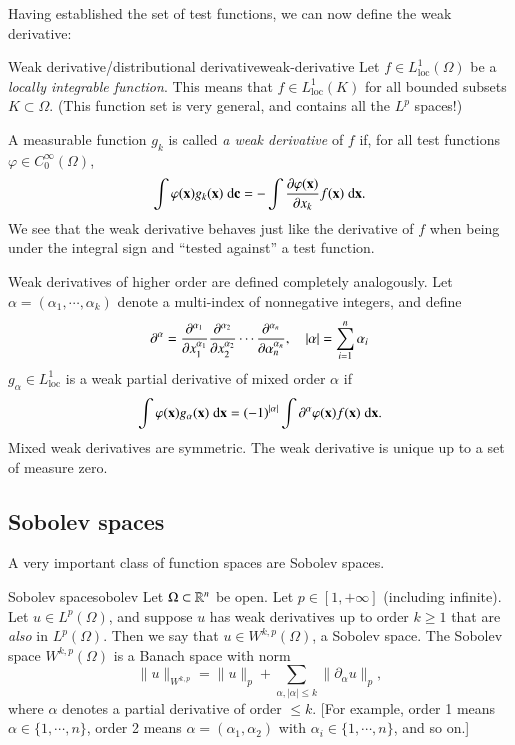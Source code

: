 
Having established the set of test functions, we can now define the weak derivative:
\begin{myDefinition}{Weak derivative/distributional derivative}{weak-derivative}
Let $f \in L^1_\text{loc}(\Omega)$ be a \emph{locally integrable function}. This means that $f \in L^1_\text{loc}(K)$ for all bounded subsets $K \subset \Omega$. (This function set is very general, and contains all the $L^p$ spaces!)

A measurable function $g_k$ is called \emph{a weak derivative} of $f$ if, for all test functions $\varphi\in C^\infty_0(\Omega)$,
\begin{equation}
    \int \varphi(\mathbf{x}) g_k(\mathbf{x}) \; \mathrm{d} \mathbf{c} = - \int \frac{\partial \varphi(\mathbf{x})}{\partial x_k} f(\mathbf{x}) \; \mathrm{d} \mathbf{x}.
\end{equation}
We see that the weak derivative behaves just like the derivative of $f$ when being under the integral sign and ``tested against'' a test function.

Weak derivatives of higher order are defined completely analogously. 
Let $\alpha = (\alpha_1,\cdots,\alpha_k)$ denote a multi-index of nonnegative integers, and define 
\begin{equation}
    \partial^\alpha = \frac{\partial ^{\alpha_1}}{\partial x_1^{\alpha_1}}\frac{\partial ^{\alpha_2}}{\partial x_2^{\alpha_2}}\cdots\frac{\partial ^{\alpha_n}}{\partial \alpha_n^{\alpha_n}}, \quad |\alpha| = \sum_{i=1}^n \alpha_i
\end{equation}
$g_\alpha \in L^1_\text{loc}$ is a weak partial derivative of mixed order $\alpha$ if
\begin{equation}
    \int \varphi(\mathbf{x}) g_\alpha(\mathbf{x}) \; \mathrm{d} \mathbf{x} = (-1)^{|\alpha|} \int \partial^\alpha{\varphi(\mathbf{x})} f(\mathbf{x}) \; \mathrm{d} \mathbf{x}.
\end{equation}
Mixed weak derivatives are symmetric. The weak derivative is unique up to a set of measure zero.

\end{myDefinition}

\subsection{Sobolev spaces}

A very important class of function spaces are Sobolev spaces.
\begin{myDefinition}{Sobolev space}{sobolev}
    Let $\Omega \subset \mathbb{R}^n$ be open. Let $p \in [1,+\infty]$ (including infinite).
    Let $u \in L^p(\Omega)$, and suppose $u$ has weak derivatives up to order $k \geq 1$ that are \emph{also} in $L^p(\Omega)$. Then we say that $u \in W^{k,p}(\Omega)$, a Sobolev space. The Sobolev space $W^{k,p}(\Omega)$ is a Banach space with norm
    \begin{equation}
    \|u\|_{W^{k,p}} = \|u\|_p + \sum_{\alpha, |\alpha|\leq k} \|\partial_\alpha u\|_p,
    \end{equation}
    where $\alpha$ denotes a partial derivative of order $\leq k$. [For example, order 1 means $\alpha\in\{1,\cdots,n\}$, order 2 means $\alpha = (\alpha_1,\alpha_2)$ with $\alpha_i \in \{1,\cdots,n\}$, and so on.]
\end{myDefinition}

